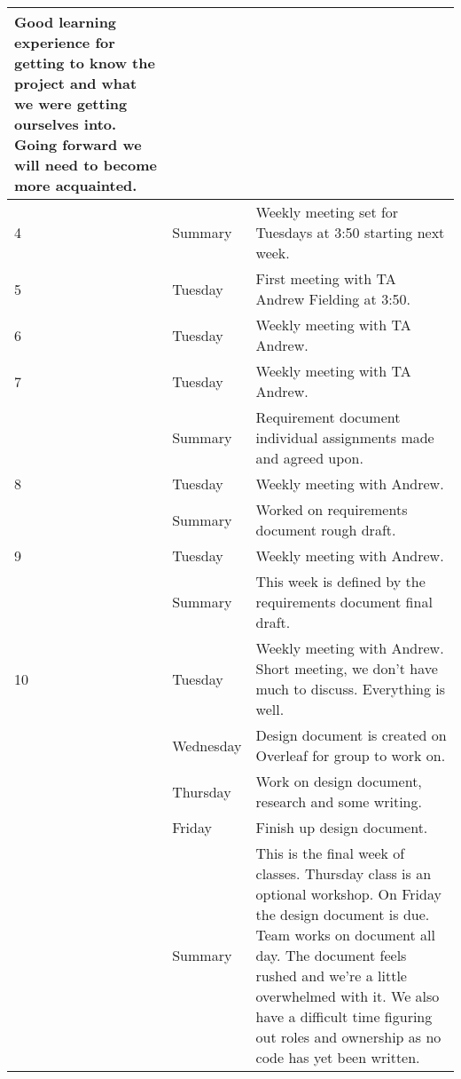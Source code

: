 \begin{longtable}{ | l | l | p{14cm} | }
Good learning experience for getting to know the project and what we were getting ourselves into. Going forward we will need to become more acquainted. \\
\hline
4 & Summary & Weekly meeting set for Tuesdays at 3:50 starting next week. \\
\hline
5 & Tuesday & First meeting with TA Andrew Fielding at 3:50. \\
\hline
6 & Tuesday & Weekly meeting with TA Andrew. \\
\hline
7 & Tuesday & Weekly meeting with TA Andrew. \\
\cline{2-3}
 & Summary & Requirement document individual assignments made and agreed upon. \\
\hline
8 & Tuesday & Weekly meeting with Andrew. \\
\cline{2-3}
 & Summary & Worked on requirements document rough draft. \\
\hline
9 & Tuesday & Weekly meeting with Andrew. \\
\cline{2-3}
 & Summary & This week is defined by the requirements document final draft. \\
\hline
10 & Tuesday & Weekly meeting with Andrew. Short meeting, we don't have much to discuss. Everything is well. \\
 & Wednesday & Design document is created on Overleaf for group to work on. \\
 & Thursday & Work on design document, research and some writing. \\
 & Friday & Finish up design document. \\
\cline{2-3}
 & Summary & This is the final week of classes. Thursday class is an optional workshop.
 On Friday the design document is due. Team works on document all day. The document feels rushed and we're a little overwhelmed with it. We also have a difficult time figuring out roles and ownership as no code has yet been written. \\
 \hline
\end{longtable}
